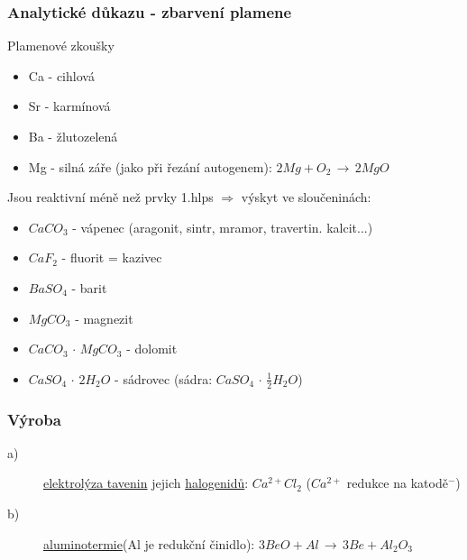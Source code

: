 \documentclass{article}
\def\WATER{H_2O}
\begin{document}
    \subsubsection{Analytické důkazu - zbarvení plamene}
        Plamenové zkoušky
        \begin{itemize}
            \item Ca - cihlová
            \item Sr - karmínová
            \item Ba - žlutozelená
            \item Mg - silná záře (jako při řezání autogenem):  $2Mg + O _2 \,\to\, 2MgO$
        \end{itemize}
    Jsou reaktivní méně než prvky 1.hlps $\Rightarrow$ výskyt ve sloučeninách:
        \begin{itemize}
            \item $CaCO_3$ - vápenec (aragonit, sintr, mramor, travertin. kalcit...)
            \item $CaF_2$ - fluorit = kazivec
            \item $BaSO _4$ - barit
            \item $MgCO_3$ - magnezit
            \item $CaCO_3 \, \cdot \, MgCO_3$ - dolomit
            \item $CaSO_4 \, \cdot \, 2\WATER$ - sádrovec (sádra: $CaSO_4 \,\cdot\, \frac{1}{2}\WATER$)
        \end{itemize}

    \subsubsection{Výroba}
        \begin{description}
            \item[a)] \underline{elektrolýza tavenin} jejich \underline{halogenidů}: \textbf{\(Ca^{2+}Cl_2\)} ($Ca^{2+}$ redukce na katodě$^-$)
            \item[b)] \underline{aluminotermie}(Al je redukční činidlo): \(3BeO + Al \,\to\, 3Be + Al_2 O_3\)
        \end{description}
\end{document}
